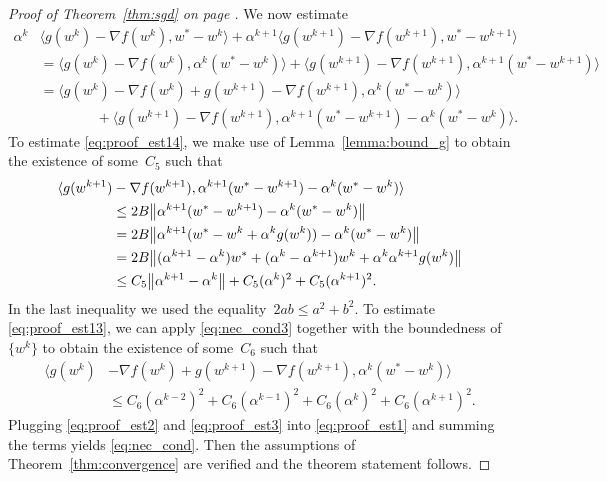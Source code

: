 \begin{proof}[Proof of Theorem~\ref{thm:sgd} on page \pageref{thm:sgd}]
  We now estimate
  \begin{subequations}\label{eq:proof_est1}
    \begin{align}
      \label{eq:proof_est11} \alpha^k
      & \langle g(w^{k})-\nabla f(w^{k}),w^*-w^{k}\rangle + \alpha^{k+1}\langle g(w^{k+1})-\nabla f(w^{k+1}),w^*-w^{k+1}\rangle \\
      \label{eq:proof_est12}
      & = \langle g(w^{k})-\nabla f(w^{k}),\alpha^k(w^*-w^{k})\rangle + \langle g(w^{k+1})-\nabla f(w^{k+1}),\alpha^{k+1}(w^*-w^{k+1})\rangle \\
      \label{eq:proof_est13}
      & = \langle g(w^{k})-\nabla f(w^{k}) + g(w^{k+1})-\nabla f(w^{k+1}),\alpha^k(w^*-w^{k})\rangle \\
      \label{eq:proof_est14}
      & \qquad \qquad + \langle g(w^{k+1})-\nabla f(w^{k+1}),\alpha^{k+1}(w^*-w^{k+1})-\alpha^k(w^*-w^{k})\rangle.
    \end{align}
  \end{subequations}
  To estimate \eqref{eq:proof_est14}, we make use of Lemma~\ref{lemma:bound_g} to obtain the existence of some~$C_5$ such that
  \begin{equation}\label{eq:proof_est2}
    \begin{aligned}
    \langle g(w^{k+1})
    & -\nabla f(w^{k+1}),\alpha^{k+1}(w^*-w^{k+1})-\alpha^k(w^*-w^{k})\rangle \\
    & \le 2B\norm{\alpha^{k+1}(w^*-w^{k+1})-\alpha^k(w^*-w^{k})} \\
    & = 2B\norm{\alpha^{k+1}(w^*-w^k+\alpha^kg(w^k))-\alpha^k(w^*-w^{k})} \\
    & = 2B\norm{(\alpha^{k+1}-\alpha^k)w^* + (\alpha^k-\alpha^{k+1})w^k +\alpha^k\alpha^{k+1} g(w^k)} \\
    & \le C_5 \nrm{\alpha^{k+1}-\alpha^k} + C_5(\alpha^k)^2 + C_5(\alpha^{k+1})^2.
    \end{aligned}
  \end{equation}
  In the last inequality we used the equality~$2ab\le a^2+b^2$. To estimate \eqref{eq:proof_est13}, we can apply \eqref{eq:nec_cond3} together with the boundedness of~$\{w^k\}$ to obtain the existence of some~$C_6$ such that
  \begin{equation}\label{eq:proof_est3}
    \begin{aligned}
      \langle g(w^{k})&-\nabla f(w^{k}) + g(w^{k+1})-\nabla f(w^{k+1}),\alpha^k(w^*-w^{k})\rangle \\
      & \le C_6(\alpha^{k-2})^2 + C_6(\alpha^{k-1})^2 + C_6(\alpha^{k})^2 + C_6(\alpha^{k+1})^2.
    \end{aligned}
  \end{equation}
  Plugging \eqref{eq:proof_est2} and \eqref{eq:proof_est3} into \eqref{eq:proof_est1} and summing the terms yields \eqref{eq:nec_cond}. Then the assumptions of Theorem~\ref{thm:convergence} are verified and the theorem statement follows.
\end{proof}

